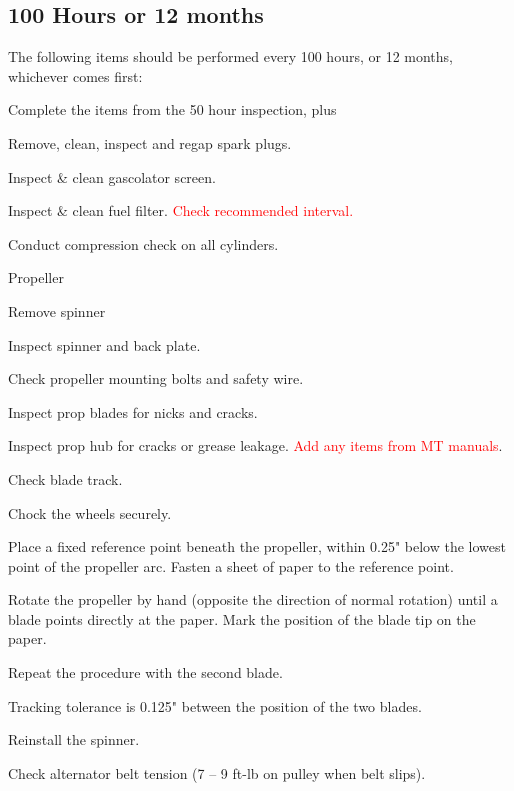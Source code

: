 \subsection{100 Hours or 12 months} The following items should be performed every 100 hours, or 12 months, whichever comes first: 
\begin{enumerate*}
	\item Complete the items from the 50 hour inspection, plus 
	\item Remove, clean, inspect and regap spark plugs.
	\item Inspect \& clean gascolator screen. 
	\item Inspect \& clean fuel filter. \textcolor{red}{Check recommended interval.} 
	\item Conduct compression check on all cylinders. 
	\item Propeller 
	\begin{enumerate*}
		\item Remove spinner 
		\item Inspect spinner and back plate. 
		\item Check propeller mounting bolts and safety wire. 
		\item Inspect prop blades for nicks and cracks. 
		\item Inspect prop hub for cracks or grease leakage. \textcolor{red}{Add any items from MT manuals}. 
		\item Check blade track. 
		\begin{enumerate*}
			\item Chock the wheels securely. 
			\item Place a fixed reference point beneath the propeller, within 0.25" below the lowest point of the propeller arc. Fasten a sheet of paper to the reference point. 
			\item Rotate the propeller by hand (opposite the direction of normal rotation) until a blade points directly at the paper. Mark the position of the blade tip on the paper. 
			\item Repeat the procedure with the second blade. 
			\item Tracking tolerance is 0.125" between the position of the two blades. 
		\end{enumerate*}
		\item Reinstall the spinner. 
	\end{enumerate*}
	\item Check alternator belt tension (7 -- 9 ft-lb on pulley when belt slips). 
\end{enumerate*}
